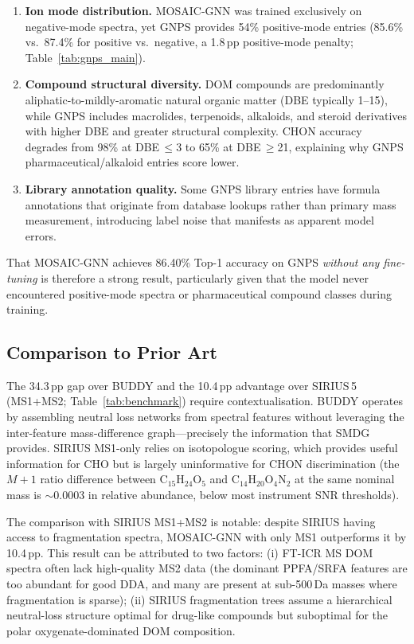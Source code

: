 \documentclass[journal=jcisd8]{achemso}
\begin{document}
\begin{enumerate}[nosep]
  \item \textbf{Ion mode distribution.}  MOSAIC-GNN was trained exclusively on
    negative-mode spectra, yet GNPS provides 54\% positive-mode entries
    (85.6\% vs.\ 87.4\% for positive vs.\ negative, a 1.8\,pp positive-mode penalty;
    Table~\ref{tab:gnps_main}).

  \item \textbf{Compound structural diversity.}  DOM compounds are predominantly
    aliphatic-to-mildly-aromatic natural organic matter (DBE typically 1--15),
    while GNPS includes macrolides, terpenoids, alkaloids, and steroid
    derivatives with higher DBE and greater structural complexity.
    CHON accuracy degrades from 98\% at DBE\,$\le$3 to 65\% at DBE\,$\ge$21,
    explaining why GNPS pharmaceutical/alkaloid entries score lower.

  \item \textbf{Library annotation quality.}  Some GNPS library entries have
    formula annotations that originate from database lookups rather than
    primary mass measurement, introducing label noise that manifests as
    apparent model errors.
\end{enumerate}

That MOSAIC-GNN achieves 86.40\% Top-1 accuracy on GNPS \emph{without any fine-tuning}
is therefore a strong result, particularly given that the model never encountered positive-mode
spectra or pharmaceutical compound classes during training.

\subsection{Comparison to Prior Art}

The 34.3\,pp gap over BUDDY and the 10.4\,pp advantage over SIRIUS\,5 (MS1+MS2;
Table~\ref{tab:benchmark}) require contextualisation.  BUDDY operates by assembling neutral loss networks from spectral features
without leveraging the inter-feature mass-difference graph---precisely the information that
SMDG provides.  SIRIUS MS1-only relies on isotopologue scoring, which provides useful
information for CHO but is largely uninformative for CHON discrimination (the $M+1$ ratio
difference between $\mathrm{C_{15}H_{24}O_5}$ and $\mathrm{C_{14}H_{20}O_4N_2}$ at the
same nominal mass is $\sim$0.0003 in relative abundance, below most instrument SNR thresholds).

The comparison with SIRIUS MS1+MS2 is notable: despite SIRIUS having access to
fragmentation spectra, MOSAIC-GNN with only MS1 outperforms it by 10.4\,pp.  This result
can be attributed to two factors: (i) FT-ICR MS DOM spectra often lack high-quality MS2
data (the dominant PPFA/SRFA features are too abundant for good DDA, and many are present
at sub-500\,Da masses where fragmentation is sparse); (ii) SIRIUS fragmentation trees
assume a hierarchical neutral-loss structure optimal for drug-like compounds but suboptimal
for the polar oxygenate-dominated DOM composition.
\end{document}
